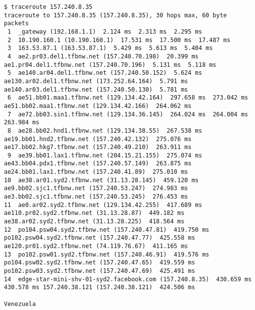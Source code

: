 \documentclass[a4paper]{article}
\begin{document}
\begin{lstlisting}
$ traceroute 157.240.8.35
traceroute to 157.240.8.35 (157.240.8.35), 30 hops max, 60 byte packets
 1  _gateway (192.168.1.1)  2.124 ms  2.313 ms  2.295 ms
 2  10.190.160.1 (10.190.160.1)  17.531 ms  17.500 ms  17.487 ms
 3  163.53.87.1 (163.53.87.1)  5.429 ms  5.613 ms  5.404 ms
 4  ae2.pr03.del1.tfbnw.net (157.240.70.198)  20.399 ms ae1.pr04.del1.tfbnw.net (157.240.70.196)  5.131 ms  5.118 ms
 5  ae140.ar04.del1.tfbnw.net (157.240.50.152)  5.624 ms ae130.ar02.del1.tfbnw.net (173.252.64.164)  5.791 ms ae140.ar03.del1.tfbnw.net (157.240.50.130)  5.781 ms
 6  ae51.bb01.maa1.tfbnw.net (129.134.42.164)  297.658 ms  273.042 ms ae51.bb02.maa1.tfbnw.net (129.134.42.166)  264.062 ms
 7  ae72.bb03.sin1.tfbnw.net (129.134.36.145)  264.024 ms  264.004 ms  263.984 ms
 8  ae28.bb02.hnd1.tfbnw.net (129.134.38.55)  267.538 ms ae19.bb01.hnd2.tfbnw.net (157.240.42.132)  275.076 ms ae17.bb02.hkg7.tfbnw.net (157.240.49.210)  263.911 ms
 9  ae39.bb01.lax1.tfbnw.net (204.15.21.155)  275.074 ms ae43.bb04.pdx1.tfbnw.net (157.240.57.149)  263.875 ms ae24.bb01.lax1.tfbnw.net (157.240.41.89)  275.010 ms
10  ae38.ar01.syd2.tfbnw.net (31.13.28.145)  459.120 ms ae9.bb02.sjc1.tfbnw.net (157.240.53.247)  274.983 ms ae3.bb02.sjc1.tfbnw.net (157.240.53.245)  276.453 ms
11  ae0.ar02.syd2.tfbnw.net (129.134.42.255)  417.689 ms ae110.pr02.syd2.tfbnw.net (31.13.28.87)  449.182 ms ae38.ar02.syd2.tfbnw.net (31.13.28.225)  418.564 ms
12  po104.psw04.syd2.tfbnw.net (157.240.47.81)  419.750 ms po102.psw04.syd2.tfbnw.net (157.240.47.77)  425.558 ms ae120.pr01.syd2.tfbnw.net (74.119.76.67)  411.165 ms
13  po102.psw01.syd2.tfbnw.net (157.240.46.91)  419.576 ms po104.psw02.syd2.tfbnw.net (157.240.47.65)  419.559 ms po102.psw03.syd2.tfbnw.net (157.240.47.69)  425.491 ms
14  edge-star-mini-shv-01-syd2.facebook.com (157.240.8.35)  430.659 ms  430.578 ms 157.240.38.121 (157.240.38.121)  424.506 ms

Venezuela


\end{lstlisting}
\end{document}
